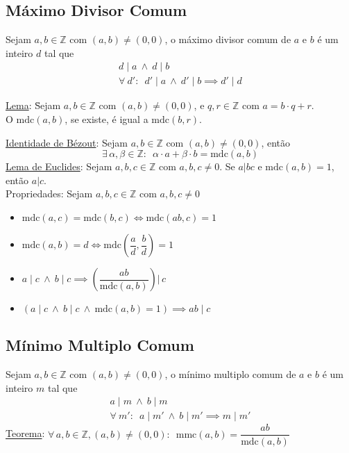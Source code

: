 \documentclass{article}
\begin{document}
\subsection{Máximo Divisor Comum}
Sejam $a, b \in \mathbb{Z}$ com $(a, b) \neq (0, 0)$, o máximo divisor comum de $a$ e $b$ é um inteiro $d$ tal que
\begin{gather*}
  d \mid a \> \land \> d \mid b \\[5pt]
  \forall \> d': \enspace d' \mid a \> \land \> d' \mid b \implies d' \mid d
\end{gather*}
\vspace{-10pt}
\begin{tabbing}
  \uline{Lema}: \= Sejam $a, b \in \mathbb{Z}$ com $(a,b) \neq (0,0)$, e $q, r \in \mathbb{Z}$ com $a = b \cdot q + r$. \\
  \> O $\text{mdc}(a,b)$, se existe, é igual a $\text{mdc}(b, r)$.
\end{tabbing}
\vspace{7pt}
\uline{Identidade de Bézout}: Sejam $a, b \in \mathbb{Z}$ com $(a,b) \neq (0,0)$, então
\vspace{-5pt}
\[ \exists \, \alpha, \beta \in \mathbb{Z}: \enspace \alpha \cdot a + \beta \cdot b = \text{mdc}(a,b) \]
\uline{Lema de Euclides}: Sejam $a,b,c \in \mathbb{Z}$ com $a,b,c \neq 0$. Se $a|bc$ e $\text{mdc}(a,b) = 1$, então $a|c$. \\[10pt]
Propriedades: Sejam $a,b,c \in \mathbb{Z}$ com $a,b,c \neq 0$
\begin{itemize}
  \item $\text{mdc}(a,c) = \text{mdc}(b,c) \iff \text{mdc}(a b,c) = 1$
  \item $\text{mdc}(a,b) = d \iff \text{mdc} \left( \dfrac{a}{d}, \dfrac{b}{d} \right) = 1$
  \item $a \mid c \:\land\: b \mid c \implies \left( \dfrac{ab}{\text{mdc}(a,b)} \right) \bigg | \, c$
  \item $(a \mid c \:\land\: b \mid c \:\land\: \text{mdc}(a,b) = 1) \implies ab \mid c$
\end{itemize}


\subsection{Mínimo Multiplo Comum}
Sejam $a, b \in \mathbb{Z}$ com $(a, b) \neq (0, 0)$, o mínimo multiplo comum de $a$ e $b$ é um inteiro $m$ tal que
\begin{gather*}
  a \mid m \:\land\: b \mid m \\[5pt]
  \forall \> m': \enspace a \mid m' \:\land\: b \mid m' \implies m \mid m'
\end{gather*}
\uline{Teorema}: $\forall \, a, b \in \mathbb{Z}, (a, b) \neq (0, 0): \enspace \text{mmc}(a,b) = \dfrac{ab}{\text{mdc}(a,b)}$
\end{document}
